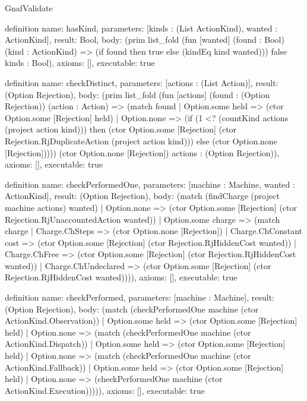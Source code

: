 \begin{lexlean}{GnafValidate}
\begin{semanticmodule}
definition{
  name: hasKind,
  parameters: [kinds : (List ActionKind), wanted : ActionKind],
  result: Bool,
  body: (prim list_fold (fun [wanted] (found : Bool) (kind : ActionKind) => (if found then true else (kindEq kind wanted))) false kinds : Bool),
  axioms: [],
  executable: true
}

definition{
  name: checkDistinct,
  parameters: [actions : (List Action)],
  result: (Option Rejection),
  body: (prim list_fold (fun [actions] (found : (Option Rejection)) (action : Action) => (match found
    | Option.some held => (ctor Option.some [Rejection] held)
    | Option.none => (if (1 <? (countKind actions (project action kind))) then (ctor Option.some [Rejection] (ctor Rejection.RjDuplicateAction (project action kind))) else (ctor Option.none [Rejection])))) (ctor Option.none [Rejection]) actions : (Option Rejection)),
  axioms: [],
  executable: true
}

definition{
  name: checkPerformedOne,
  parameters: [machine : Machine, wanted : ActionKind],
  result: (Option Rejection),
  body: (match (findCharge (project machine actions) wanted)
    | Option.none => (ctor Option.some [Rejection] (ctor Rejection.RjUnaccountedAction wanted))
    | Option.some charge => (match charge
      | Charge.ChSteps => (ctor Option.none [Rejection])
      | Charge.ChConstant cost => (ctor Option.some [Rejection] (ctor Rejection.RjHiddenCost wanted))
      | Charge.ChFree => (ctor Option.some [Rejection] (ctor Rejection.RjHiddenCost wanted))
      | Charge.ChUndeclared => (ctor Option.some [Rejection] (ctor Rejection.RjHiddenCost wanted)))),
  axioms: [],
  executable: true
}

definition{
  name: checkPerformed,
  parameters: [machine : Machine],
  result: (Option Rejection),
  body: (match (checkPerformedOne machine (ctor ActionKind.Observation))
    | Option.some held => (ctor Option.some [Rejection] held)
    | Option.none => (match (checkPerformedOne machine (ctor ActionKind.Dispatch))
      | Option.some held => (ctor Option.some [Rejection] held)
      | Option.none => (match (checkPerformedOne machine (ctor ActionKind.Fallback))
        | Option.some held => (ctor Option.some [Rejection] held)
        | Option.none => (checkPerformedOne machine (ctor ActionKind.Execution))))),
  axioms: [],
  executable: true
}


\end{semanticmodule}
\end{lexlean}
